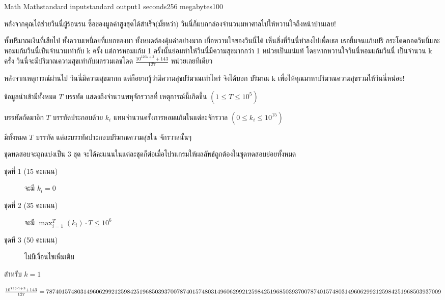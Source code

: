 \documentclass[11pt,a4paper]{article}
\begin{document}
\begin{problem}{Math Math}{standard input}{standard output}{1 seconds}{256 megabytes}{100}

หลังจากคุณได้ช่วยวินนี่ผู้ร้อนรน ซื้อของมูลค่าสูงสุดได้สำเร็จ(มั้ยหว่า) วินนี่ก็แบกกล่องจำนวนมหาศาลไปให้หวานใจถึงหน้าบ้านเลย!

ทั้งปริมาณเงินที่เสียไป ทั้งความเหนื่อยที่แบกของมา ทั้งหมดต้องคุ้มค่าอย่างมาก เมื่อหวานใจของวินนี่ได้ เห็นสิ่งที่วินนี่ทำลงไปเพื่อเธอ
เธอยิ้มจนแก้มปริ กระโดดกอดวินนี่และหอมแก้มวินนี่เป็นจำนวนเท่ากับ k ครั้ง แต่การหอมแก้ม 1 ครั้งนั้นย่อมทำให้วินนี่มีความสุขมากกว่า 1 หน่วยเป็นแน่แท้ 
โดยหากหวานใจวินนี่หอมแก้มวินนี่ เป็นจำนวน k ครั้ง วินนี่จะมีปริมาณความสุขเท่ากับผลรวมเลขโดด $\frac{10^{126k + 3} + 143}{127}$ หน่วยเลยทีเดียว

หลังจากเหตุการณ์ผ่านไป วินนี่มีความสุขมากก แต่ก็อยากรู้ว่ามีความสุขปริมาณเท่าไหร่ จึงได้บอก ปริมาณ k เพื่อให้คุณมาหาปริมาณความสุขรวมให้วินนี่หน่อย!

\InputFile
ข้อมูลนำเข้ามีทั้งหมด $T$ บรรทัด แสดงถึงจำนวนพหุจักรวาลที่ เหตุการณ์นี้เกิดขึ้น $(1 \leq T \leq 10^5)$

บรรทัดถัดมาอีก $T$ บรรทัดประกอบด้วย $k_i$ แทนจำนวนครั้งการหอมแก้มในแต่ละจักรวาล $(0 \leq k_i \leq 10^{15})$ 

\OutputFile
มีทั้งหมด $T$ บรรทัด แต่ละบรรทัดประกอบปริมาณความสุขใน จักรวาลนั้นๆ

\Scoring
ชุดทดสอบจะถูกแบ่งเป็น 3 ชุด จะได้คะแนนในแต่ละชุดก็ต่อเมื่อโปรแกรมให้ผลลัพธ์ถูกต้องในชุดทดสอบย่อยทั้งหมด

\begin{description}

\item[ชุดที่ 1 (15 คะแนน)] จะมี $k_i = 0$

\item[ชุดที่ 2 (35 คะแนน)] จะมี $\max_{i=1}^T(k_i) \cdot T \leq 10^6$

\item[ชุดที 3 (50 คะแนน)] ไม่มีเงื่อนไขเพิ่มเติม

\end{description}

\Examples

\begin{example}
%
\end{example}

\pagebreak

\Note

สำหรับ $k = 1$

$\frac{10^{126\cdot1 + 3} + 143}{127} = 787401574803149606299212598425196850393700787401574803149606299212598425\\1968503937007874015748031496062992125984251968503937009$


\end{problem}
\end{document}
